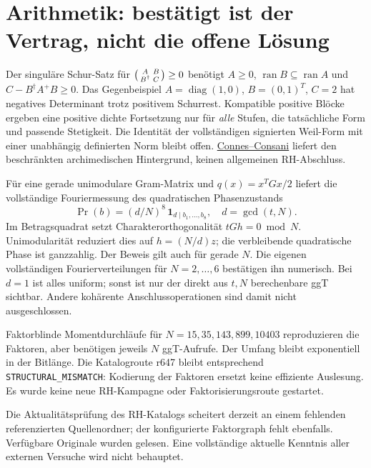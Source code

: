 \section{Arithmetik: bestätigt ist der Vertrag, nicht die offene Lösung}
Der singuläre Schur-Satz für $\begin{psmallmatrix}A&B\\B^\dagger&C\end{psmallmatrix}\ge0$ benötigt $A\ge0$, $\operatorname{ran}B\subseteq\operatorname{ran}A$ und $C-B^\dagger A^+B\ge0$. Das Gegenbeispiel $A=\operatorname{diag}(1,0)$, $B=(0,1)^T$, $C=2$ hat negatives Determinant trotz positivem Schurrest. Kompatible positive Blöcke ergeben eine positive dichte Fortsetzung nur für \emph{alle} Stufen, die tatsächliche Form und passende Stetigkeit. Die Identität der vollständigen signierten Weil-Form mit einer unabhängig definierten Norm bleibt offen. \href{https://arxiv.org/abs/2006.13771}{Connes--Consani} liefert den beschränkten archimedischen Hintergrund, keinen allgemeinen RH-Abschluss.

Für eine gerade unimodulare Gram-Matrix und $q(x)=x^TGx/2$ liefert die vollständige Fouriermessung des quadratischen Phasenzustands
\begin{equation}
\Pr(b)=(d/N)^8\,\mathbf1_{d\mid b_1,\ldots,b_8},\quad d=\gcd(t,N).
\end{equation}
Im Betragsquadrat setzt Charakterorthogonalität $tGh=0\bmod N$. Unimodularität reduziert dies auf $h=(N/d)z$; die verbleibende quadratische Phase ist ganzzahlig. Der Beweis gilt auch für gerade $N$. Die eigenen vollständigen Fourierverteilungen für $N=2,\ldots,6$ bestätigen ihn numerisch. Bei $d=1$ ist alles uniform; sonst ist nur der direkt aus $t,N$ berechenbare ggT sichtbar. Andere kohärente Anschlussoperationen sind damit nicht ausgeschlossen.

Faktorblinde Momentdurchläufe für $N=15,35,143,899,10403$ reproduzieren die Faktoren, aber benötigen jeweils $N$ ggT-Aufrufe. Der Umfang bleibt exponentiell in der Bitlänge. Die Katalogroute r647 bleibt entsprechend \texttt{STRUCTURAL\_MISMATCH}: Kodierung der Faktoren ersetzt keine effiziente Auslesung. Es wurde keine neue RH-Kampagne oder Faktorisierungsroute gestartet.

Die Aktualitätsprüfung des RH-Katalogs scheitert derzeit an einem fehlenden referenzierten Quellenordner; der konfigurierte Faktorgraph fehlt ebenfalls. Verfügbare Originale wurden gelesen. Eine vollständige aktuelle Kenntnis aller externen Versuche wird nicht behauptet.

